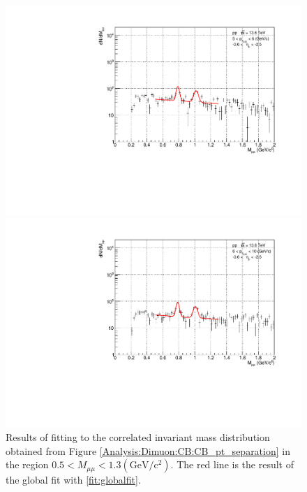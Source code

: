 \begin{figure}[H]
\begin{minipage}{0.45\textwidth}
                    \end{minipage}
                    \\
                    \vspace{1em}
                    \begin{minipage}{0.45\textwidth}
                        \centering
                        \includegraphics[width=\textwidth]{fig/3_4_2_fit_pt_5to6.pdf}
                        \captionsetup{labelformat=empty}
                        \caption*{$5 < p_{T\mu\mu} < 6 (\mathrm{GeV/c})$}
                    \end{minipage}
                    \hfill
                    \begin{minipage}{0.45\textwidth}
                        \centering
                        \includegraphics[width=\textwidth]{fig/3_4_2_fit_pt_6to10.pdf}
                        \captionsetup{labelformat=empty}
                        \caption*{$6 < p_{T\mu\mu} < 10 (\mathrm{GeV/c})$}
                    \end{minipage}
                    \caption{Results of fitting to the correlated invariant mass distribution obtained from Figure \ref{Analysis:Dimuon:CB:CB_pt_separation} in the region $0.5 < M_{\mu\mu} < 1.3 (\mathrm{GeV/c^2})$. The red line is the result of the global fit with \ref{fit:globalfit}.}
                    \label{Analysis:Dimuon:Yield:fit}
                \end{figure}
